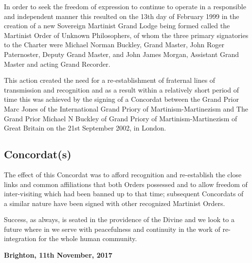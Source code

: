 In order to seek the freedom of expression to continue to operate in a responsible and independent
manner this resulted on the 13th day of February 1999 in the creation of a new Sovereign Martinist
Grand Lodge being formed called the Martinist Order of Unknown Philosophers, of whom the
three primary signatories to the Charter were Michael Norman Buckley, Grand Master, John
Roger Paternoster, Deputy Grand Master, and John James Morgan, Assistant Grand Master and
acting Grand Recorder.

This action created the need for a re-establishment of fraternal lines of transmission and
recognition and as a result within a relatively short period of time this was achieved by the signing
of a Concordat between the Grand Prior Marc Jones of the International Grand Priory of
Martinism-Martinezism and The Grand Prior Michael N Buckley of Grand Priory of
Martinism-Martinezism of Great Britain on the 21st September 2002, in London.

\subsection{Concordat(s)}

The effect of this Concordat was to afford recognition and re-establish the close links and common
affiliations that both Orders possessed and to allow freedom of inter-visiting which had been
banned up to that time; subsequent Concordats of a similar nature have been signed with other
recognized Martinist Orders. 

Success, as always, is seated in the providence of the Divine and we look to a future where in we
serve with peacefulness and continuity in the work of re-integration for the whole human
community.

\textbf{Brighton, 11th November, 2017}